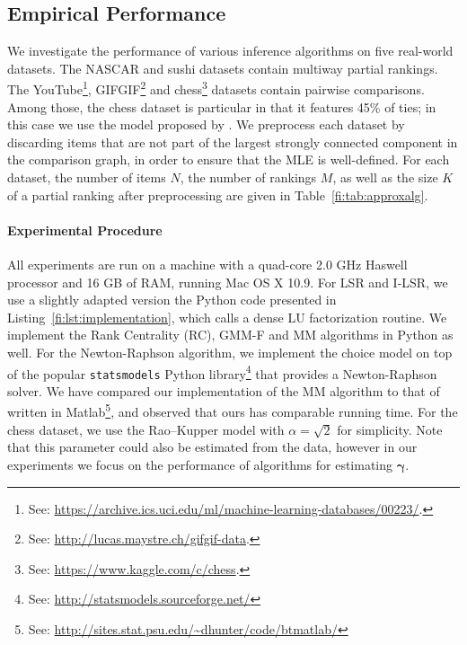 \subsection{Empirical Performance}

We investigate the performance of various inference algorithms on five real-world datasets.
The NASCAR \citep{hunter2004mm} and sushi \citep{kamishima2009efficient} datasets contain multiway partial rankings.
The YouTube\footnote{%
See: \url{https://archive.ics.uci.edu/ml/machine-learning-databases/00223/}.},
GIFGIF\footnote{%
See: \url{http://lucas.maystre.ch/gifgif-data}.}
and chess\footnote{%
See: \url{https://www.kaggle.com/c/chess}.}
datasets contain pairwise comparisons.
Among those, the chess dataset is particular in that it features 45\% of ties;
in this case we use the model proposed by \citet{rao1967ties}.
We preprocess each dataset by discarding items that are not part of the largest strongly connected component in the comparison graph, in order to ensure that the MLE is well-defined.
For each  dataset, the number of items $N$, the number of rankings $M$, as well as the size $K$ of a partial ranking after preprocessing are given in Table~\ref{fi:tab:approxalg}.

\paragraph{Experimental Procedure}
All experiments are run on a machine with a quad-core 2.0 GHz Haswell processor and 16 GB of RAM, running Mac OS X 10.9.
For LSR and I-LSR, we use a slightly adapted version the Python code presented in Listing~\ref{fi:lst:implementation}, which calls a dense LU factorization routine.
We implement the Rank Centrality (RC), GMM-F and MM \citep{hunter2004mm} algorithms in Python as well.
For the Newton-Raphson algorithm, we implement the choice model on top of the popular \texttt{statsmodels} Python library\footnote{%
See: \url{http://statsmodels.sourceforge.net/}
} that provides a Newton-Raphson solver.
We have compared our implementation of the MM algorithm to that of \citeauthor{hunter2004mm} written in Matlab\footnote{%
See: \url{http://sites.stat.psu.edu/~dhunter/code/btmatlab/}
}, and observed that ours has comparable running time.
For the chess dataset, we use the Rao--Kupper model with $\alpha = \sqrt{2}$ for simplicity.
Note that this parameter could also be estimated from the data, however in our experiments we focus on the performance of algorithms for estimating $\bm{\gamma}$.


